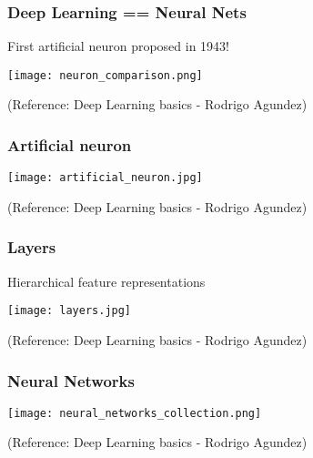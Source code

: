 \begin{frame}[fragile] \frametitle{Deep Learning == Neural Nets }
First artificial neuron proposed in 1943!

\begin{center}
\texttt{[image: neuron\_comparison.png]}

\end{center}

\tiny{(Reference: Deep Learning basics - Rodrigo Agundez)}

\end{frame}


\begin{frame}[fragile] \frametitle{Artificial neuron}

\begin{center}
\texttt{[image: artificial\_neuron.jpg]}

\end{center}

\tiny{(Reference: Deep Learning basics - Rodrigo Agundez)}

\end{frame}

\begin{frame}[fragile] \frametitle{Layers}

Hierarchical feature representations

\begin{center}
\texttt{[image: layers.jpg]}

\end{center}

\tiny{(Reference: Deep Learning basics - Rodrigo Agundez)}

\end{frame}

\begin{frame}[fragile] \frametitle{Neural Networks}

\begin{center}
\texttt{[image: neural\_networks\_collection.png]}

\end{center}

\tiny{(Reference: Deep Learning basics - Rodrigo Agundez)}

\end{frame}


